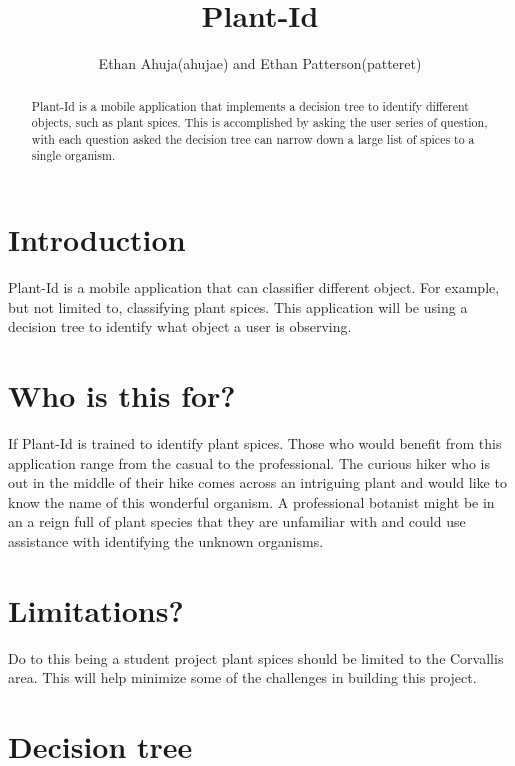 \documentclass[a4paper]{article}
\title{Plant-Id}
\author{Ethan Ahuja(ahujae) and Ethan Patterson(patteret)}
\begin{document}
\maketitle

\begin{abstract}
Plant-Id is a mobile application that implements a decision tree to identify different objects, such as plant spices. This is accomplished by asking the user series of question, with each question asked the decision tree can narrow down a large list of spices to a single organism.
\end{abstract}
\section{Introduction}
Plant-Id is a mobile application that can classifier different object. For example, but not limited to, classifying plant spices. This application will be using a decision tree to identify what object a user is observing.
\section{Who is this for?}
If Plant-Id is trained to identify plant spices. Those who would benefit from this application range from the casual to the professional. The curious hiker who is out in the middle of their hike comes across an intriguing plant and would like to know the name of this wonderful organism. A professional botanist might be in an a reign full of plant species that they are unfamiliar with and could use assistance with identifying the unknown organisms. 
\section{Limitations?}
Do to this being a student project plant spices should be limited to the Corvallis area. This will help minimize some of the challenges in building this project. 
\section{Decision tree}
\end{document}
